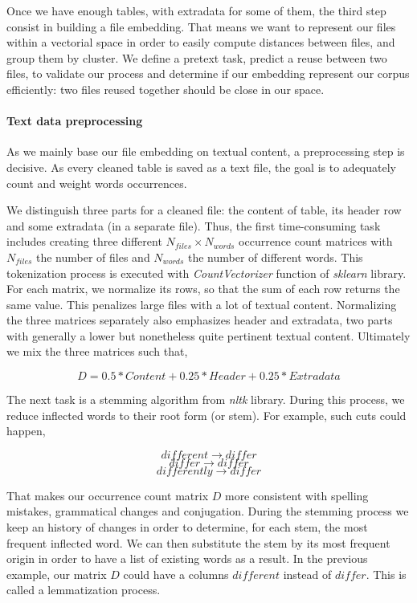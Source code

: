 \documentclass[a4paper]{article}
\begin{document}
	Once we have enough tables, with extradata for some of them, the third step consist in building a file embedding. That means we want to represent our files within a vectorial space in order to easily compute distances between files, and group them by cluster. We define a pretext task, predict a reuse between two files, to validate our process and determine if our embedding represent our corpus efficiently: two files reused together should be close in our space. 
	
	\paragraph{Text data preprocessing}
	
	As we mainly base our file embedding on textual content, a preprocessing step is decisive. As every cleaned table is saved as a text file, the goal is to adequately count and weight words occurrences.
	
	We distinguish three parts for a cleaned file: the content of table, its header row and some extradata (in a separate file). Thus, the first time-consuming task includes creating three different $N_{files} \times N_{words}$ occurrence count matrices with $N_{files}$ the number of files and $N_{words}$ the number of different words. This tokenization process is executed with \emph{CountVectorizer} function of \emph{sklearn} library. For each matrix, we normalize its rows, so that the sum of each row returns the same value. This penalizes large files with a lot of textual content. Normalizing the three matrices separately also emphasizes header and extradata, two parts with generally a lower but nonetheless quite pertinent textual content. Ultimately we mix the three matrices such that,
	
	\begin{equation}
		D = 0.5 * Content + 0.25 * Header + 0.25 * Extradata		
	\end{equation}
	
	The next task is a stemming algorithm from \emph{nltk} library. During this process, we reduce inflected words to their root form (or stem). For example, such cuts could happen,
	
	\[
		different \rightarrow differ
	\]
	\[
		differ \rightarrow differ
	\]
	\[
		differently \rightarrow differ
	\]

	That makes our occurrence count matrix $D$ more consistent with spelling mistakes, grammatical changes and conjugation. During the stemming process we keep an history of changes in order to determine, for each stem, the most frequent inflected word. We can then substitute the stem by its most frequent origin in order to have a list of existing words as a result. In the previous example, our matrix $D$ could have a columns $different$ instead of $differ$. This is called a lemmatization process.
	
\end{document}

